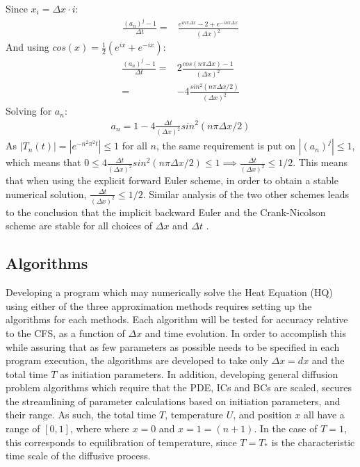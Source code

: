 \documentclass[%
oneside,                 %
final,                   %
10pt]{article}
\begin{document}
Since $x_i=\Delta x \cdot i$:
\begin{align*}
\frac{(a_n)^{j}- 1 }{\Delta t} =&\frac{ e^{in\pi \Delta x} -2 + e^{-in\pi \Delta x}}{(\Delta x)^2}
\end{align*}
And using $cos(x)=\frac{1}{2}\left(e^{ix}+e^{-ix} \right)$:
\begin{align*}
\frac{(a_n)^{j}- 1 }{\Delta t} =&2 \frac{cos(n\pi \Delta x)-1}{(\Delta x)^2}\\
=&-4 \frac{sin^2(n\pi \Delta x/2)}{(\Delta x)^2}
\end{align*}
Solving for $a_n$:
\begin{align}
a_n=1-4 \frac{\Delta t}{(\Delta x)^2}sin^2(n\pi \Delta x/2)
\end{align}
As $|T_n(t)|=|e^{-n^2\pi^2t}|\leq 1$ for all $n$, the same requirement is put on $|(a_n)^j|\leq 1$, which means that  
$0 \leq 4 \frac{\Delta t}{(\Delta x)^2}sin^2(n\pi \Delta x/2) \leq 1 \implies \frac{\Delta t}{(\Delta x)^2} \leq 1/2$. \newline
This means that when using the explicit forward Euler scheme, in order to obtain a stable numerical solution, $\frac{\Delta t}{(\Delta x)^2} \leq 1/2$.
Similar analysis of the two other schemes leads to the conclusion that the implicit backward Euler and the Crank-Nicolson scheme are stable for all choices of $\Delta x$ and $\Delta t$ \citep[p.312]{HJ15}.
\subsection{Algorithms}
Developing a program which may numerically solve the Heat Equation (HQ) using either of the three approximation methods requires setting up the algorithms for each methods. Each algorithm will be tested for accuracy relative to the CFS, as a function of $\Delta x$ and time evolution. In order to accomplish this while assuring that as few parameters as possible needs to be specified in each program execution, the algorithms are developed to take only $\Delta x= dx$ and the total time $T$ as initiation parameters. In addition, developing general diffusion problem algorithms which require that the PDE, ICs and BCs are scaled, secures the streamlining of parameter calculations based on initiation parameters, and their range. As such, the total time $T$, temperature $U$, and position $x$ all have a range of $[0,1]$, where where $x=0$ and $x=1=(n+1)$. In the case of $T=1$, this corresponds to equilibration of temperature, since $T=T_*$ is the characteristic time scale of the diffusive process. \newline
\end{document}
